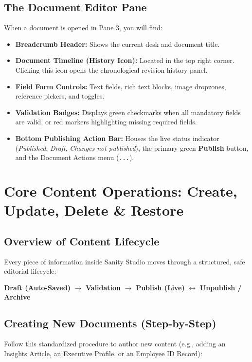 \documentclass[11pt,a4paper,oneside]{book}
\begin{document}
\section{The Document Editor Pane}
When a document is opened in Pane 3, you will find:
\begin{itemize}
  \item \textbf{Breadcrumb Header:} Shows the current desk and document title.
  \item \textbf{Document Timeline (History Icon):} Located in the top right corner. Clicking this icon opens the chronological revision history panel.
  \item \textbf{Field Form Controls:} Text fields, rich text blocks, image dropzones, reference pickers, and toggles.
  \item \textbf{Validation Badges:} Displays green checkmarks when all mandatory fields are valid, or red markers highlighting missing required fields.
  \item \textbf{Bottom Publishing Action Bar:} Houses the live status indicator (\textit{Published}, \textit{Draft}, \textit{Changes not published}), the primary green \textbf{Publish} button, and the Document Actions menu (\texttt{...}).
\end{itemize}

\chapter{Core Content Operations: Create, Update, Delete \& Restore}
\label{chap:crud}

\section{Overview of Content Lifecycle}
Every piece of information inside Sanity Studio moves through a structured, safe editorial lifecycle:
\begin{center}
  \textbf{Draft (Auto-Saved)} $\longrightarrow$ \textbf{Validation} $\longrightarrow$ \textbf{Publish (Live)} $\longleftrightarrow$ \textbf{Unpublish / Archive}
\end{center}

\section{Creating New Documents (Step-by-Step)}
Follow this standardized procedure to author new content (e.g., adding an Insights Article, an Executive Profile, or an Employee ID Record):
\end{document}
